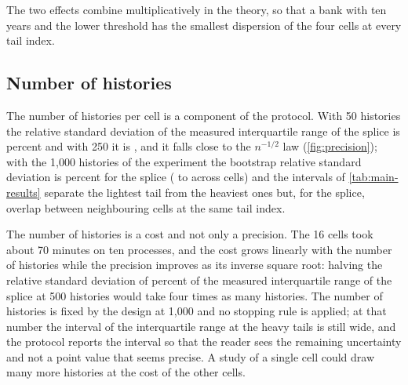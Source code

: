 The two effects combine multiplicatively in the theory, so that a bank with ten years and the lower threshold has the smallest dispersion of the four cells at every tail index.

\subsection{Number of histories}
\label{sec:abl-histories}

The number of histories per cell is a component of the protocol. With 50 histories the relative standard deviation of the measured interquartile range of the splice is \subSpFifty{} percent and with 250 it is \subSpTwoFifty{}, and it falls close to the $n^{-1/2}$ law (\cref{fig:precision}); with the 1{,}000 histories of the experiment the bootstrap relative standard deviation is \bootSpMed{} percent for the splice (\bootSpMin{} to \bootSpMax{} across cells) and the intervals of \cref{tab:main-results} separate the lightest tail from the heaviest ones but, for the splice, overlap between neighbouring cells at the same tail index.

The number of histories is a cost and not only a precision. The 16 cells took about 70 minutes on ten processes, and the cost grows linearly with the number of histories while the precision improves as its inverse square root: halving the relative standard deviation of \subSpFiveHundred{} percent of the measured interquartile range of the splice at 500 histories would take four times as many histories. The number of histories is fixed by the design at 1{,}000 and no stopping rule is applied; at that number the interval of the interquartile range at the heavy tails is still wide, and the protocol reports the interval so that the reader sees the remaining uncertainty and not a point value that seems precise. A study of a single cell could draw many more histories at the cost of the other cells.
